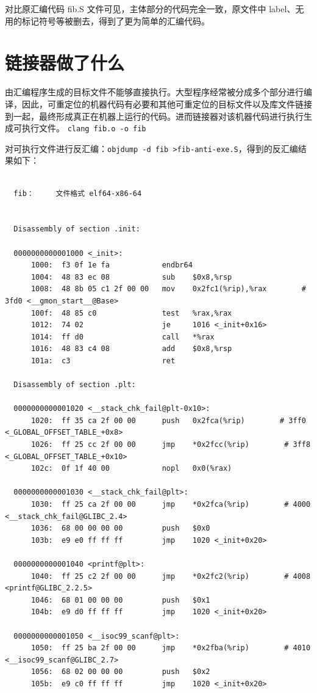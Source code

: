\documentclass[UTF8,a4paper,10pt]{ctexart}
\begin{document}
对比原汇编代码 fib.S 文件可见，主体部分的代码完全一致，原文件中 label、无用的标记符号等被删去，得到了更为简单的汇编代码。

\section{链接器做了什么}
由汇编程序生成的目标文件不能够直接执行。大型程序经常被分成多个部分进行编译，因此，可重定位的机器代码有必要和其他可重定位的目标文件以及库文件链接到一起，最终形成真正在机器上运行的代码。进而链接器对该机器代码进行执行生成可执行文件。
\verb|clang fib.o -o fib|

对可执行文件进行反汇编：\verb|objdump -d fib >fib-anti-exe.S|，得到的反汇编结果如下：

\begin{verbatim}

  fib：     文件格式 elf64-x86-64


  Disassembly of section .init:
  
  0000000000001000 <_init>:
      1000:  f3 0f 1e fa            endbr64
      1004:  48 83 ec 08            sub    $0x8,%rsp
      1008:  48 8b 05 c1 2f 00 00   mov    0x2fc1(%rip),%rax        # 3fd0 <__gmon_start__@Base>
      100f:  48 85 c0               test   %rax,%rax
      1012:  74 02                  je     1016 <_init+0x16>
      1014:  ff d0                  call   *%rax
      1016:  48 83 c4 08            add    $0x8,%rsp
      101a:  c3                     ret
  
  Disassembly of section .plt:
  
  0000000000001020 <__stack_chk_fail@plt-0x10>:
      1020:  ff 35 ca 2f 00 00      push   0x2fca(%rip)        # 3ff0 <_GLOBAL_OFFSET_TABLE_+0x8>
      1026:  ff 25 cc 2f 00 00      jmp    *0x2fcc(%rip)        # 3ff8 <_GLOBAL_OFFSET_TABLE_+0x10>
      102c:  0f 1f 40 00            nopl   0x0(%rax)
  
  0000000000001030 <__stack_chk_fail@plt>:
      1030:  ff 25 ca 2f 00 00      jmp    *0x2fca(%rip)        # 4000 <__stack_chk_fail@GLIBC_2.4>
      1036:  68 00 00 00 00         push   $0x0
      103b:  e9 e0 ff ff ff         jmp    1020 <_init+0x20>
  
  0000000000001040 <printf@plt>:
      1040:  ff 25 c2 2f 00 00      jmp    *0x2fc2(%rip)        # 4008 <printf@GLIBC_2.2.5>
      1046:  68 01 00 00 00         push   $0x1
      104b:  e9 d0 ff ff ff         jmp    1020 <_init+0x20>
  
  0000000000001050 <__isoc99_scanf@plt>:
      1050:  ff 25 ba 2f 00 00      jmp    *0x2fba(%rip)        # 4010 <__isoc99_scanf@GLIBC_2.7>
      1056:  68 02 00 00 00         push   $0x2
      105b:  e9 c0 ff ff ff         jmp    1020 <_init+0x20>
  

\end{verbatim}
\end{document}

